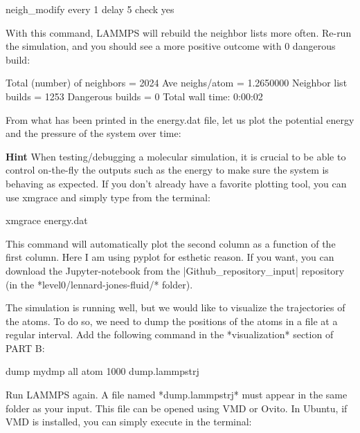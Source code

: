 \begin{lcverbatim}
neigh_modify every 1 delay 5 check yes
\end{lcverbatim}

With this command, LAMMPS will rebuild the neighbor lists
more often. Re-run the simulation, and you should see a more
positive outcome with 0 dangerous build:



\begin{lcverbatim}
Total (number) of neighbors = 2024
Ave neighs/atom = 1.2650000
Neighbor list builds = 1253
Dangerous builds = 0
Total wall time: 0:00:02
\end{lcverbatim}

From what has been printed in the energy.dat file, let us
plot the potential energy and the pressure of
the system over time:






\textbf{Hint} When testing/debugging a molecular simulation, it is crucial to be able to control 
on-the-fly the outputs such as the energy to make sure the
system is behaving as expected. If you don't already have 
a favorite plotting tool, you can use xmgrace and simply type from the terminal:
\begin{lcverbatim}
xmgrace energy.dat
\end{lcverbatim}

This command will automatically plot the second column as a function of the first column.
Here I am using pyplot for esthetic reason. If you want, you can download the Jupyter-notebook
from the |Github_repository_input| repository (in the *level0/lennard-jones-fluid/* folder).










The simulation is running well, but we would like to
visualize the trajectories of the atoms. To do so, we need
to dump the positions of the atoms in a file at a regular
interval. Add the following command in the *visualization*
section of PART B:



\begin{lcverbatim}
dump mydmp all atom 1000 dump.lammpstrj
\end{lcverbatim}

Run LAMMPS again. A file named *dump.lammpstrj* must appear in
the same folder as your input. This file can be opened using
VMD or Ovito. In Ubuntu, if VMD is installed, you can simply
execute in the terminal:



